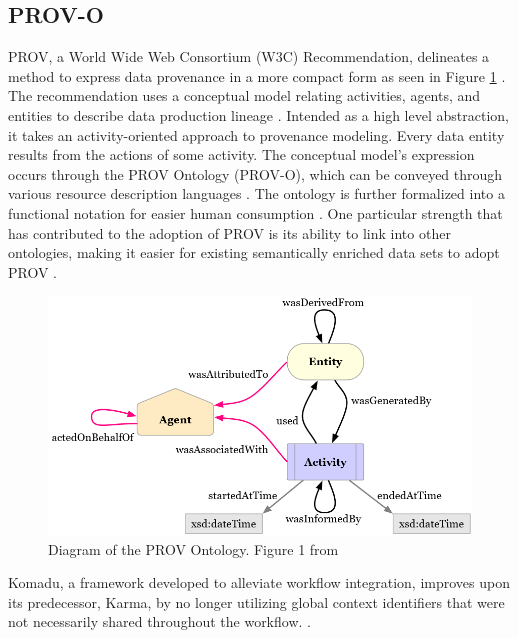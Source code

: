 \subsection{PROV-O}

PROV, a World Wide Web Consortium (W3C) Recommendation, delineates a method to express data provenance in a more compact form as seen in Figure \ref{PROVO} \cite{Gil2013a} \cite{Groth2013}.
The recommendation uses a conceptual model relating activities, agents, and entities to describe data production lineage \cite{Moreau2013c} \cite{Nies2013} \cite{Nies2013a}.
Intended as a high level abstraction, it takes an activity-oriented approach to provenance modeling.
Every data entity results from the actions of some activity.
The conceptual model's expression occurs through the PROV Ontology (PROV-O), which can be conveyed through various resource description languages \cite{Hua2013} \cite{Klyne2013}.
The ontology is further formalized into a functional notation for easier human consumption \cite{Moreau2013b} \cite{Cheney2013a}.
One particular strength that has contributed to the adoption of PROV is its ability to link into other ontologies, making it easier for existing semantically enriched data sets to adopt PROV \cite{Miles2013} \cite{Moreau2013}.
\begin{figure}
	\centering
	\includegraphics[scale=0.5]{figures/ProvO.png}
	\caption[Diagram of the PROV Ontology.]{Diagram of the PROV Ontology.  Figure 1 from \cite{Lebo2013}}
	\label{PROVO}
\end{figure}
Komadu, a framework developed to alleviate workflow integration, improves upon its predecessor, Karma, by no longer utilizing global context identifiers that were not necessarily shared throughout the workflow. \cite{Suriarachchi_2015}.

